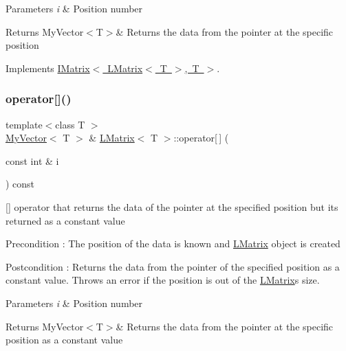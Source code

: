 \begin{DoxyParams}{Parameters}
{\em i} & Position number \\
\hline
\end{DoxyParams}
\begin{DoxyReturn}{Returns}
My\+Vector$<$\+T$>$\& Returns the data from the pointer at the specific position 
\end{DoxyReturn}


Implements \mbox{\hyperlink{class_i_matrix_a3cfb2490e2849c6c19c1979066a64818}{I\+Matrix$<$ L\+Matrix$<$ T $>$, T $>$}}.

\mbox{\label{class_l_matrix_a56ec5ba9be0bb900ddc0ee7c5283bccd}} 
\subsubsection{\texorpdfstring{operator[]()}{operator[]()}\hspace{0.1cm}{\footnotesize\ttfamily [2/2]}}
{\footnotesize\ttfamily template$<$class T $>$ \\
\mbox{\hyperlink{class_my_vector}{My\+Vector}}$<$ T $>$ \& \mbox{\hyperlink{class_l_matrix}{L\+Matrix}}$<$ T $>$\+::operator\mbox{[}$\,$\mbox{]} (\begin{DoxyParamCaption}\item[{const int \&}]{i }\end{DoxyParamCaption}) const\hspace{0.3cm}{\ttfamily [virtual]}}



\mbox{[}\mbox{]} operator that returns the data of the pointer at the specified position but its returned as a constant value 

\begin{DoxyPrecond}{Precondition}
\+: The position of the data is known and \mbox{\hyperlink{class_l_matrix}{L\+Matrix}} object is created 
\end{DoxyPrecond}
\begin{DoxyPostcond}{Postcondition}
\+: Returns the data from the pointer of the specified position as a constant value. Throws an error if the position is out of the \mbox{\hyperlink{class_l_matrix}{L\+Matrix}}\textquotesingle{}s size. 
\end{DoxyPostcond}

\begin{DoxyParams}{Parameters}
{\em i} & Position number \\
\hline
\end{DoxyParams}
\begin{DoxyReturn}{Returns}
My\+Vector$<$\+T$>$\& Returns the data from the pointer at the specific position as a constant value 
\end{DoxyReturn}


